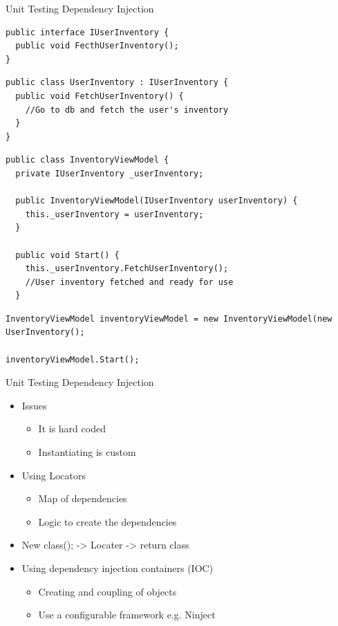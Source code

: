 \begin{frame} [fragile] {Unit Testing} {Dependency Injection}

\begin{lstlisting}
public interface IUserInventory {
  public void FecthUserInventory();
}
\end{lstlisting}

\begin{lstlisting}
public class UserInventory : IUserInventory {
  public void FetchUserInventory() {
    //Go to db and fetch the user's inventory
  }
}
\end{lstlisting}

\begin{lstlisting}
public class InventoryViewModel {
  private IUserInventory _userInventory;
  
  public InventoryViewModel(IUserInventory userInventory) {
    this._userInventory = userInventory;
  }
  
  public void Start() {
    this._userInventory.FetchUserInventory();
    //User inventory fetched and ready for use
  }
\end{lstlisting}

\begin{lstlisting}
InventoryViewModel inventoryViewModel = new InventoryViewModel(new UserInventory();

inventoryViewModel.Start();
\end{lstlisting}

\end{frame}

\begin{frame} {Unit Testing} {Dependency Injection}

\begin{itemize}
	\item Issues
		\begin{itemize}
			\item It is hard coded
			\item Instantiating is custom
		\end{itemize}
\end{itemize}

\begin{itemize}
	\item Using Locators
		\begin{itemize}
			\item Map of dependencies
			\item Logic to create the dependencies
		\end{itemize}
	\item New class(); -> Locater -> return class
	\item Using dependency injection containers (IOC)
		\begin{itemize}
			\item Creating and coupling of objects
			\item Use a configurable framework e.g. Ninject
		\end{itemize}		 
\end{itemize}

\end{frame}